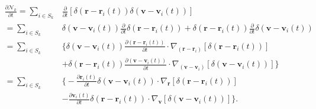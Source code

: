\documentclass{article}
\begin{document}
\begin{align*}
\frac{\partial \mathcal{N}_k}{\partial t}=\sum_{i\in S_k}& \frac{\partial}{\partial t}\left[\delta(\mathbf{r}-\mathbf{r}_i(t))\delta(\mathbf{v}-\mathbf{v}_i(t))\right]\\
=\sum_{i\in S_k}& \delta(\mathbf{v}-\mathbf{v}_i(t))\frac{\partial}{\partial t}\delta(\mathbf{r}-\mathbf{r}_i(t))+\delta(\mathbf{r}-\mathbf{r}_i(t))\frac{\partial }{\partial t}\delta(\mathbf{v}-\mathbf{v}_i(t))\\
=\sum_{i\in S_k}&\bigg\{\delta(\mathbf{v}-\mathbf{v}_i(t))\frac{\partial(\mathbf{r}-\mathbf{r}_i(t))}{\partial t}\cdot\nabla_{(\mathbf{r}-\mathbf{r}_i)}[\delta(\mathbf{r}-\mathbf{r}_i(t))]\\
&+\delta(\mathbf{r}-\mathbf{r}_i(t))\frac{\partial(\mathbf{v}-\mathbf{v}_i(t))}{\partial t}\cdot\nabla_{(\mathbf{v}-\mathbf{v}_i)}[\delta(\mathbf{v}-\mathbf{v}_i(t))]\bigg\}\\
=\sum_{i\in S_k}&\bigg\{-\frac{\partial \mathbf{r}_i(t)}{\partial t}\delta(\mathbf{v}-\mathbf{v}_i(t))\cdot \nabla_\mathbf{r}[\delta(\mathbf{r}-\mathbf{r}_i(t))]\\&-\frac{\partial \mathbf{v}_i(t)}{\partial t}\delta(\mathbf{r}-\mathbf{r}_i(t))\cdot \nabla_\mathbf{v}[\delta(\mathbf{v}-\mathbf{v}_i(t))]\bigg\}.
\end{align*}
\end{document}
